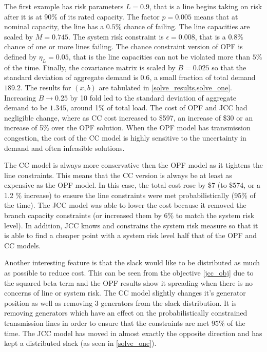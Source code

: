 The first example has risk parameters $L=0.9$, that is a line  begins taking on risk after it is at 90\% of its rated capacity.  The factor $p=0.005$ means that at nominal capacity, the line has a $0.5\%$ chance of failing.  The line capacities are scaled by $M=0.745$. The system risk constraint is $\epsilon=0.008$, that is a $0.8\%$ chance of one or more lines failing.  The chance constraint version of OPF is defined by $\eta_L=0.05$, that is the line capacities can not be violated more than $5\%$ of the time.  Finally, the covariance matrix is scaled by $B=0.025$ so that the standard deviation of aggregate demand is $0.6$, a small fraction of total demand $189.2$.  The results for $(x,b)$ are tabulated in \cref{solve_results,solve_one}.  Increasing $B\rightarrow 0.25$ by 10 fold led to the standard deviation of aggregate demand to be $1.345$, around 1\% of total load.  The cost of OPF and JCC had negligible change, where as CC cost increased to \$597, an increase of \$30 or an increase of 5\% over the OPF solution. When the OPF model has transmission congestion, the cost of the CC model is highly sensitive to the uncertainty in demand  and  often infeasible solutions.



The CC model is always more conservative then the OPF model as it tightens the line constraints.  This means that the CC version is always be at least as expensive as the OPF model.  In this case, the total cost rose by \$7 (to \$574, or a 1.2 \% increase) to ensure the line constraints were met probabilistically (95\% of the time).  The JCC model was able to lower the cost because it removed the branch capacity constraints (or increased them by 6\% to match the system risk level).  In addition, JCC knows and constrains the system risk measure so that it is able to find a cheaper point with a system risk level half that of the OPF and CC models.



Another interesting feature is that the slack would like to be distributed as much as possible to reduce cost.  This can be seen from the objective \ref{jcc_obj} due to the squared beta term and the OPF results show it spreading when there is no concerns of line or system risk.  The CC model slightly changes it's generator position as well as removing 3 generators from the slack distribution.  It is removing generators which have an effect on the probabilistically constrained transmission lines in order to ensure that the constraints are met $95\%$ of the time.  The JCC model has moved in almost exactly the opposite direction and has kept a distributed slack (as seen in \cref{solve_one}).




